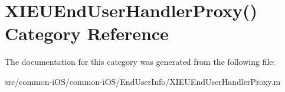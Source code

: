 \hypertarget{category_x_i_e_u_end_user_handler_proxy_07_08}{}\section{X\+I\+E\+U\+End\+User\+Handler\+Proxy() Category Reference}
\label{category_x_i_e_u_end_user_handler_proxy_07_08}


The documentation for this category was generated from the following file\+:\begin{DoxyCompactItemize}
\item 
src/common-\/i\+O\+S/common-\/i\+O\+S/\+End\+User\+Info/X\+I\+E\+U\+End\+User\+Handler\+Proxy.\+m\end{DoxyCompactItemize}
